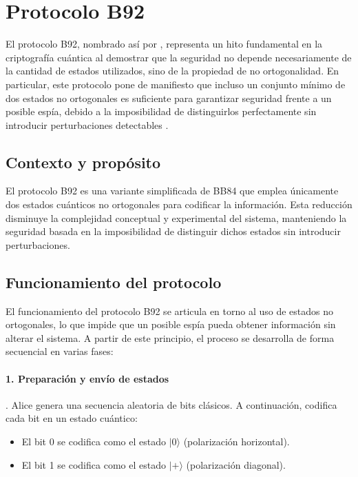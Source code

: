 \section{Protocolo B92}

El protocolo B92, nombrado así por \cite{bennett1992}, representa un hito fundamental en la criptografía cuántica al demostrar que la seguridad no depende necesariamente de la cantidad de estados utilizados, sino de la propiedad de no ortogonalidad. En particular, este protocolo pone de manifiesto que incluso un conjunto mínimo de dos estados no ortogonales es suficiente para garantizar seguridad frente a un posible espía, debido a la imposibilidad de distinguirlos perfectamente sin introducir perturbaciones detectables \citep{gisin2002}.

\subsection{Contexto y propósito}

El protocolo B92 es una variante simplificada de BB84 \citep{bennett1984} que emplea únicamente dos estados cuánticos no ortogonales \citep{schrodinger1926quantisierung} para codificar la información. Esta reducción disminuye la complejidad conceptual y experimental del sistema, manteniendo la seguridad basada en la imposibilidad de distinguir dichos estados sin introducir perturbaciones.

\subsection{Funcionamiento del protocolo}

El funcionamiento del protocolo B92 se articula en torno al uso de estados no ortogonales, lo que impide que un posible espía pueda obtener información sin alterar el sistema. A partir de este principio, el proceso se desarrolla de forma secuencial en varias fases:

\paragraph{1. Preparación y envío de estados}. Alice genera una secuencia aleatoria de bits clásicos. A continuación, 
codifica cada bit en un estado cuántico:

\begin{itemize}
    \item El bit 0 se codifica como el estado $|0\rangle$ (polarización horizontal).
    \item El bit 1 se codifica como el estado $|{+}\rangle$ (polarización diagonal).
\end{itemize}

